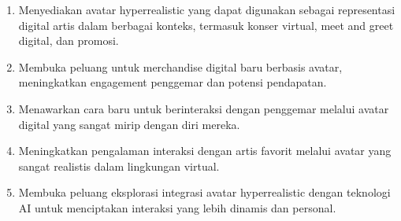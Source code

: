 \begin{enumerate}
    \item Menyediakan avatar hyperrealistic yang dapat digunakan sebagai representasi digital artis dalam berbagai konteks, termasuk konser virtual, meet and greet digital, dan promosi.
    \item Membuka peluang untuk merchandise digital baru berbasis avatar, meningkatkan engagement penggemar dan potensi pendapatan.
    \item Menawarkan cara baru untuk berinteraksi dengan penggemar melalui avatar digital yang sangat mirip dengan diri mereka.
    \item Meningkatkan pengalaman interaksi dengan artis favorit melalui avatar yang sangat realistis dalam lingkungan virtual.
    \item Membuka peluang eksplorasi integrasi avatar hyperrealistic dengan teknologi AI untuk menciptakan interaksi yang lebih dinamis dan personal.
\end{enumerate}

